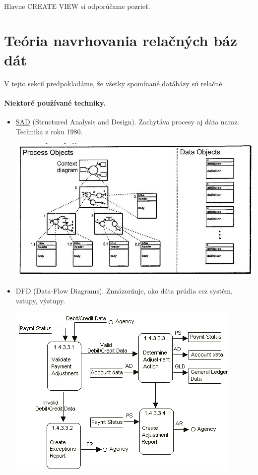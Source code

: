 \documentclass[10pt,a4paper]{article}
\begin{document}
Hlavne CREATE VIEW si odporúčame pozrieť. 

\section{Teória navrhovania relačných báz dát} 

V tejto sekcií predpokladáme, že všetky spomínané datábázy sú relačné. 

\paragraph{Niektoré používané techniky.}
\begin{itemize}
\item \href{http://en.wikipedia.org/wiki/Structured_analysis}{SAD} (Structured Analysis and Design). Zachytáva procesy aj dáta naraz. Technika z roku 1980.
\begin{center}
\includegraphics[scale=0.5]{db_sad.jpg}
\end{center}
\item DFD (Data-Flow Diagrams). Znnázorňuje, ako dáta prúdia cez systém, vstupy, výstupy. 
\begin{center}
\includegraphics[scale=0.75]{db_dfd.png}

\end{center}
\end{itemize}
\end{document}
